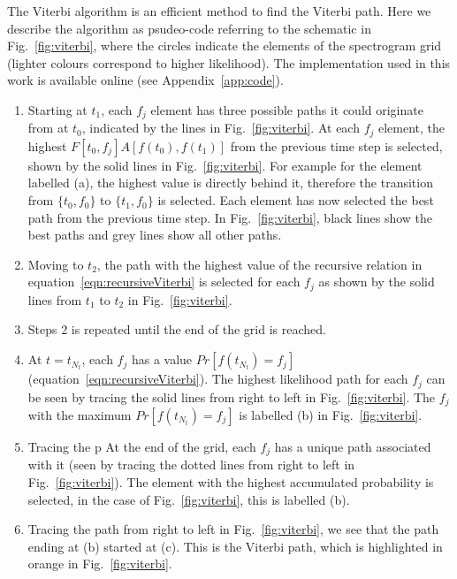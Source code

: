 \documentclass[paper-main.tex]{subfiles}
\begin{document}
The Viterbi algorithm is an efficient method to find the Viterbi path. 
Here we describe the algorithm as psudeo-code referring to the schematic in Fig.~\ref{fig:viterbi}, where the circles indicate the elements of the spectrogram grid (lighter colours correspond to higher likelihood). 
The implementation used in this work is available online (see Appendix~\ref{app:code}).
\begin{enumerate}
\item Starting at $t_1$, each $f_j$ element has three possible paths it could originate from at $t_0$, indicated by the lines in Fig.~\ref{fig:viterbi}. 
At each $f_j$ element, the highest $F[t_0,f_j] A[f(t_0),f(t_1)]$ from the previous time step is selected, shown by the solid lines in Fig.~\ref{fig:viterbi}. 
For example for the element labelled (a), the highest value is directly behind it, therefore the transition from $\{t_0,f_0\}$ to $\{t_1,f_0\}$ is selected. 
Each element has now selected the best path from the previous time step. 
In Fig.~\ref{fig:viterbi}, black lines show the best paths and grey lines show all other paths. 
\item Moving to $t_2$, the path with the highest value of the recursive relation in equation~\ref{eqn:recursiveViterbi} is selected for each $f_j$ as shown by the solid lines from $t_1$ to $t_2$ in Fig.~\ref{fig:viterbi}. 
\item Steps 2 is repeated until the end of the grid is reached. 
\item At $t=t_{N_t}$, each $f_j$ has a value $Pr[f(t_{N_t})=f_j]$ (equation~\ref{eqn:recursiveViterbi}). 
The highest likelihood path for each $f_j$ can be seen by tracing the solid lines from right to left in Fig.~\ref{fig:viterbi}. 
The $f_j$ with the maximum $Pr[f(t_{N_t})=f_j]$ is labelled (b) in Fig.~\ref{fig:viterbi}. 
\item Tracing the p
At the end of the grid, each $f_j$ has a unique path associated with it (seen by tracing the dotted lines from right to left in Fig.~\ref{fig:viterbi}). The element with the highest accumulated probability is selected, in the case of Fig.~\ref{fig:viterbi}, this is labelled (b). 
\item Tracing the path from right to left in Fig.~\ref{fig:viterbi}, we see that the path ending at (b) started at (c). This is the Viterbi path, which is highlighted in orange in Fig.~\ref{fig:viterbi}. 
\end{enumerate}
\end{document}
